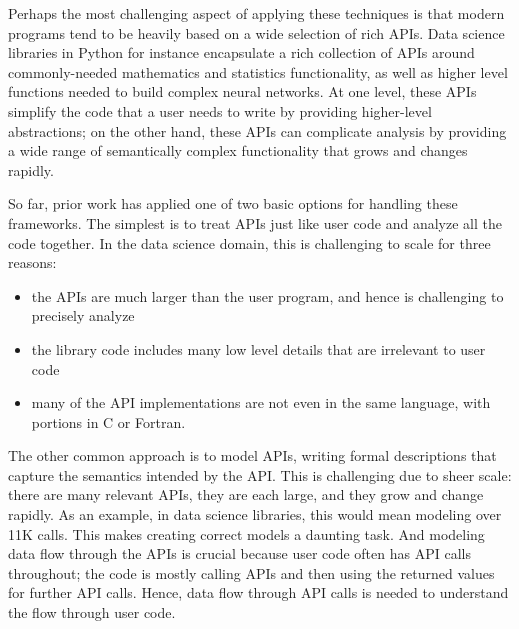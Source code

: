 Perhaps the most challenging aspect of applying these techniques is that modern programs tend to be heavily based on a wide selection of rich APIs.  Data science libraries in Python for instance encapsulate a rich collection of APIs around commonly-needed mathematics and statistics functionality, as well as higher level functions needed to build complex neural networks.  At one level, these APIs simplify the code that a user needs to write by providing higher-level abstractions; on the other hand, these APIs can complicate analysis by providing a wide range of semantically complex functionality that grows and changes rapidly.

So far, prior work has applied one of two basic options for handling these frameworks.  The simplest is to treat APIs just like user code and analyze all the code together.  In the data science domain, this is challenging to scale for three reasons:
\begin{itemize}
\item the APIs are much larger than the user program, and hence is challenging to precisely analyze
\item the library code includes many low level details that are irrelevant to user code
\item many of the API implementations are not even in the same language, with portions in C or Fortran.
\end{itemize}

The other common approach is to model APIs, writing formal descriptions that capture the semantics intended by the API.  This is challenging due to sheer scale: there are many relevant APIs, they are each large, and they grow and change rapidly.  As an example, in data science libraries, this would mean modeling over 11K calls.  This makes creating correct models a daunting task.  And modeling data flow through the APIs is crucial because user code often has API calls throughout; the code is mostly calling APIs and then using the returned values for further API calls.  Hence, data flow through API calls is needed to understand the flow through user code.

